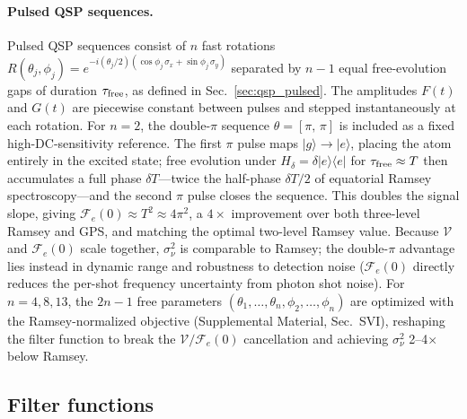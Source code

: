 \documentclass[aps,pra,twocolumn,superscriptaddress,longbibliography]{revtex4-2}
\begin{document}
\paragraph{Pulsed QSP sequences.}
Pulsed QSP sequences consist of $n$ fast rotations
$R(\theta_j,\phi_j) = e^{-i(\theta_j/2)(\cos\phi_j\,\sigma_x+\sin\phi_j\,\sigma_y)}$
separated by $n-1$ equal free-evolution gaps of duration $\tau_{\rm free}$,
as defined in Sec.~\ref{sec:qsp_pulsed}.
The amplitudes $F(t)$ and $G(t)$ are piecewise constant between pulses and
stepped instantaneously at each rotation.
For $n=2$, the double-$\pi$ sequence $\theta=[\pi,\,\pi]$ is included as a
fixed high-DC-sensitivity reference.
The first $\pi$ pulse maps $|g\rangle\to|e\rangle$, placing the atom entirely
in the excited state; free evolution under $H_\delta=\delta|e\rangle\langle e|$
for $\tau_{\rm free}\approx T$ then accumulates a full phase $\delta T$---twice
the half-phase $\delta T/2$ of equatorial Ramsey spectroscopy---and the second
$\pi$ pulse closes the sequence.
This doubles the signal slope, giving
$\mathcal{F}_e(0)\approx T^2\approx 4\pi^2$, a $4\times$ improvement over both
three-level Ramsey and GPS, and matching the optimal two-level Ramsey value.
Because $\mathcal{V}$ and $\mathcal{F}_e(0)$ scale together, $\sigma^2_\nu$ is
comparable to Ramsey; the double-$\pi$ advantage lies instead in dynamic range
and robustness to detection noise ($\mathcal{F}_e(0)$ directly reduces the
per-shot frequency uncertainty from photon shot noise).
For $n=4,8,13$, the $2n-1$ free parameters
$(\theta_1,\ldots,\theta_n,\phi_2,\ldots,\phi_n)$ are optimized with the
Ramsey-normalized objective (Supplemental Material, Sec.~SVI), reshaping
the filter function to break the $\mathcal{V}/\mathcal{F}_e(0)$ cancellation
and achieving $\sigma^2_\nu$ 2--4$\times$ below Ramsey.


\subsection{Filter functions}
\label{sec:filter_functions_comparison}
\end{document}
